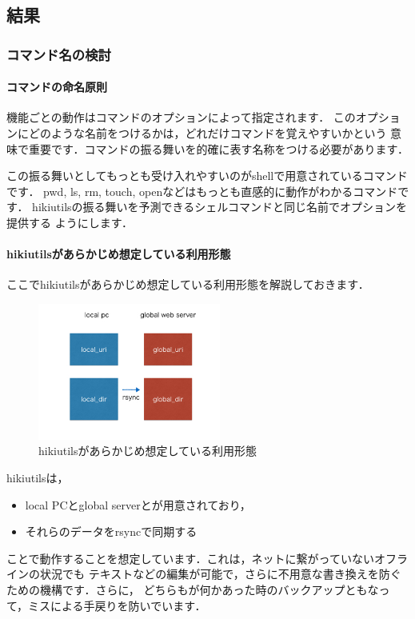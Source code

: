 
\subsection{結果}
\subsubsection{コマンド名の検討}
\paragraph{コマンドの命名原則}
機能ごとの動作はコマンドのオプションによって指定されます．
このオプションにどのような名前をつけるかは，どれだけコマンドを覚えやすいかという
意味で重要です．コマンドの振る舞いを的確に表す名称をつける必要があります．

この振る舞いとしてもっとも受け入れやすいのがshellで用意されているコマンドです．
pwd, ls, rm, touch, openなどはもっとも直感的に動作がわかるコマンドです．
hikiutilsの振る舞いを予測できるシェルコマンドと同じ名前でオプションを提供する
ようにします．

\paragraph{hikiutilsがあらかじめ想定している利用形態}
ここでhikiutilsがあらかじめ想定している利用形態を解説しておきます．

\begin{figure}[htbp]\begin{center}
\includegraphics[width=6cm,bb=0 0 442 500]{../figs/./hikiutils_yamane_09_copy.002.jpg}
\caption{hikiutilsがあらかじめ想定している利用形態}
\label{default}\end{center}\end{figure}
hikiutilsは，

\begin{itemize}
\item local PCとglobal serverとが用意されており，
\item それらのデータをrsyncで同期する
\end{itemize}
ことで動作することを想定しています．これは，ネットに繋がっていないオフラインの状況でも
テキストなどの編集が可能で，さらに不用意な書き換えを防ぐための機構です．さらに，
どちらもが何かあった時のバックアップともなって，ミスによる手戻りを防いでいます．

